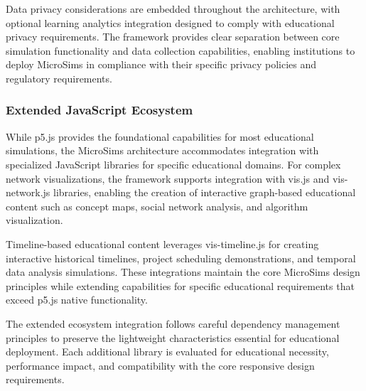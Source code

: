 Data privacy considerations are embedded throughout the architecture, with optional learning analytics integration designed to comply with educational privacy requirements. The framework provides clear separation between core simulation functionality and data collection capabilities, enabling institutions to deploy MicroSims in compliance with their specific privacy policies and regulatory requirements.

\subsubsection{Extended JavaScript Ecosystem}

While p5.js provides the foundational capabilities for most educational simulations, the MicroSims architecture accommodates integration with specialized JavaScript libraries for specific educational domains. For complex network visualizations, the framework supports integration with vis.js and vis-network.js libraries, enabling the creation of interactive graph-based educational content such as concept maps, social network analysis, and algorithm visualization.

Timeline-based educational content leverages vis-timeline.js for creating interactive historical timelines, project scheduling demonstrations, and temporal data analysis simulations. These integrations maintain the core MicroSims design principles while extending capabilities for specific educational requirements that exceed p5.js native functionality.

The extended ecosystem integration follows careful dependency management principles to preserve the lightweight characteristics essential for educational deployment. Each additional library is evaluated for educational necessity, performance impact, and compatibility with the core responsive design requirements.
